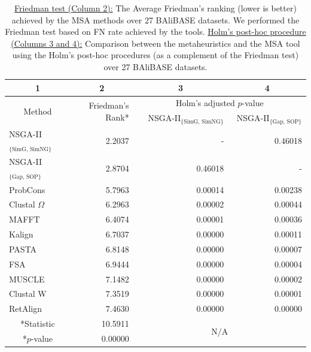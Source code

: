 \begin{table}[htbp]
	\centering
	\caption{\underline{Friedman test (Column 2):} The Average Friedman's ranking (lower is better) achieved by the MSA methods over 27 BAliBASE datasets. We performed the Friedman test based on FN rate achieved by the tools. 
		\underline{Holm's post-hoc procedure (Columns 3 and 4):} Comparison between the metaheuristics and the MSA tool using the Holm's post-hoc procedures (as a complement of the Friedman test) over 27 BAliBASE datasets. 
	}
	\begin{tabular}{|l|r||r|r|}
		\hline
		\multicolumn{1}{|c|}{1} & \multicolumn{1}{c||}{2} & \multicolumn{1}{c|}{3} & \multicolumn{1}{c|}{4} \\
		\hline
		\multicolumn{1}{|c|}{\multirow{2}{*}{Method}} &  \multirow{2}{*}{Friedman's Rank*}  & \multicolumn{2}{c|}{Holm's adjusted $p$-value} \\
		\cline{3-4}     &  & NSGA-II$_{\text{\{SimG, SimNG\}}}$ & NSGA-II$_{\text{\{Gap, SOP\}}}$ \\
		\hline
		NSGA-II$_{\text{\{SimG, SimNG\}}}$ & 2.2037 & \multicolumn{1}{c|}{~~~~~~~~~~~~~~~~~~~~-} & 0.46018 \\
		\hline
		NSGA-II$_{\text{\{Gap, SOP\}}}$ & 2.8704 & 0.46018 & \multicolumn{1}{c|}{~~~~~~~~~~~~~~~~-} \\
		\hline
		ProbCons & 5.7963 & 0.00014 & 0.00238 \\
		\hline
		Clustal $\Omega$ & 6.2963 & 0.00002 & 0.00044 \\
		\hline
		MAFFT & 6.4074 & 0.00001 & 0.00036 \\
		\hline
		Kalign & 6.7037 & 0.00000 & 0.00011 \\
		\hline
		PASTA & 6.8148 & 0.00000 & 0.00007 \\
		\hline
		FSA   & 6.9444 & 0.00000 & 0.00004 \\
		\hline
		MUSCLE & 7.1482 & 0.00000 & 0.00002 \\
		\hline
		Clustal W & 7.3519 & 0.00000 & 0.00001 \\
		\hline
		RetAlign & 7.4630 & 0.00000 & 0.00000 \\
		\hline
		\hline
		\multicolumn{1}{|c|}{*Statistic} & 10.5911 & \multicolumn{2}{c|}{\multirow{2}{*}{N/A}} \\
		\cline{1-2}    \multicolumn{1}{|c|}{*$p$-value} & 0.00000 & \multicolumn{2}{c|}{} \\
		\hline
	\end{tabular}%
	\label{tab:friedman_holm}%
\end{table}%

